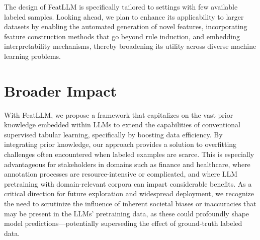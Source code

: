 The design of \textsf{FeatLLM} is specifically tailored to settings with few available labeled samples. Looking ahead, we plan to enhance its applicability to larger datasets by enabling the automated generation of novel features, incorporating feature construction methods that go beyond rule induction, and embedding interpretability mechanisms, thereby broadening its utility across diverse machine learning problems.

\section{Broader Impact}
With \textsf{FeatLLM}, we propose a framework that capitalizes on the vast prior knowledge embedded within LLMs to extend the capabilities of conventional supervised tabular learning, specifically by boosting data efficiency. By integrating prior knowledge, our approach provides a solution to overfitting challenges often encountered when labeled examples are scarce. This is especially advantageous for stakeholders in domains such as finance and healthcare, where annotation processes are resource-intensive or complicated, and where LLM pretraining with domain-relevant corpora can impart considerable benefits. As a critical direction for future exploration and widespread deployment, we recognize the need to scrutinize the influence of inherent societal biases or inaccuracies that may be present in the LLMs’ pretraining data, as these could profoundly shape model predictions—potentially superseding the effect of ground-truth labeled data.

